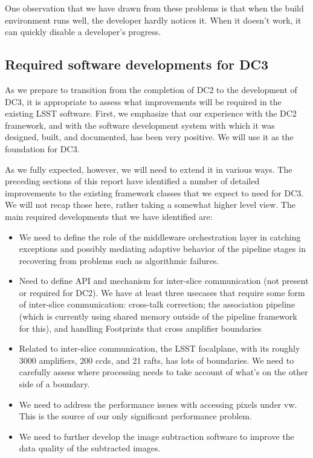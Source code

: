 One observation that we have drawn from these problems is that
when the build environment runs well, the developer hardly notices it.
When it doesn't work, it can quickly disable a developer's progress.

\subsection{Required software developments for DC3}

As we prepare to transition from the completion of DC2 to the
development of DC3, it is appropriate to assess what improvements will
be required in the existing LSST software.  First, we emphasize that
our experience with the DC2 framework, and with the software
development system with which it was designed, built, and documented,
has been very positive.  We will use it as the foundation for DC3.

As we fully expected, however, we will need to extend it in various ways. The
preceding sections of this report have identified a number of detailed
improvements to the existing framework classes that we expect to need
for DC3.  We will not recap those here, rather taking a somewhat
higher level view.  The main required developments that we have
identified are:

\begin{itemize}

\item We need to define the role of the middleware orchestration layer in
   catching exceptions and possibly mediating adaptive behavior of the
   pipeline stages in recovering from problems such as algorithmic
   failures.

\item Need to define API and mechanism for inter-slice communication (not
   present or required for DC2).  We
   have at least three usecases that require some form of inter-slice
   communication: cross-talk correction; the association pipeline (which
   is currently using shared memory outside of the pipeline framework
   for this), and handling Footprints that cross amplifier boundaries

\item Related to inter-slice communication, the LSST focalplane, with
   its roughly 3000 amplifiers, 200 ccds, and 21 rafts, has lots of
   boundaries. We need to carefully assess where processing needs to take account of
   what's on the other side of a boundary.

\item We need to address the performance issues with accessing pixels
   under vw.  This is the source of our only significant performance problem.

\item We need to further develop the image subtraction software to
improve the data quality of the subtracted images.

\end{itemize}

